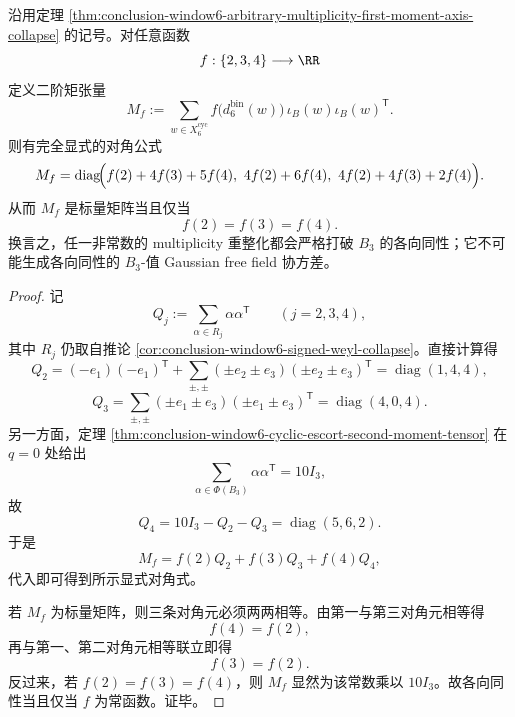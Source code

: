 \begin{theorem}\label{thm:conclusion-window6-arbitrary-multiplicity-second-moment-rigidity}
沿用定理 \ref{thm:conclusion-window6-arbitrary-multiplicity-first-moment-axis-collapse} 的记号。对任意函数
\[
f:\{2,3,4\}\longrightarrow \RR
\]
定义二阶矩张量
\[
M_f
:=
\sum_{w\in X_6^{\mathrm{cyc}}}
f\!\bigl(d_6^{\mathrm{bin}}(w)\bigr)\,
\iota_B(w)\iota_B(w)^{\mathsf T}.
\]
则有完全显式的对角公式
\[
M_f
=
\operatorname{diag}\!\Bigl(
f(2)+4f(3)+5f(4),\ 
4f(2)+6f(4),\ 
4f(2)+4f(3)+2f(4)
\Bigr).
\]
从而 \(M_f\) 是标量矩阵当且仅当
\[
f(2)=f(3)=f(4).
\]
换言之，任一非常数的 multiplicity 重整化都会严格打破 \(B_3\) 的各向同性；它不可能生成各向同性的 \(B_3\)-值 Gaussian free field 协方差。
\end{theorem}
\begin{proof}
记
\[
Q_j:=\sum_{\alpha\in R_j}\alpha\alpha^{\mathsf T}
\qquad (j=2,3,4),
\]
其中 \(R_j\) 仍取自推论 \ref{cor:conclusion-window6-signed-weyl-collapse}。直接计算得
\[
Q_2
=
(-e_1)(-e_1)^{\mathsf T}
+\sum_{\pm,\pm}(\pm e_2\pm e_3)(\pm e_2\pm e_3)^{\mathsf T}
=
\operatorname{diag}(1,4,4),
\]
\[
Q_3
=
\sum_{\pm,\pm}(\pm e_1\pm e_3)(\pm e_1\pm e_3)^{\mathsf T}
=
\operatorname{diag}(4,0,4).
\]
另一方面，定理 \ref{thm:conclusion-window6-cyclic-escort-second-moment-tensor} 在 \(q=0\) 处给出
\[
\sum_{\alpha\in\Phi(B_3)}\alpha\alpha^{\mathsf T}=10I_3,
\]
故
\[
Q_4=10I_3-Q_2-Q_3=\operatorname{diag}(5,6,2).
\]
于是
\[
M_f=f(2)Q_2+f(3)Q_3+f(4)Q_4,
\]
代入即可得到所示显式对角式。

若 \(M_f\) 为标量矩阵，则三条对角元必须两两相等。由第一与第三对角元相等得
\[
f(4)=f(2),
\]
再与第一、第二对角元相等联立即得
\[
f(3)=f(2).
\]
反过来，若 \(f(2)=f(3)=f(4)\)，则 \(M_f\) 显然为该常数乘以 \(10I_3\)。故各向同性当且仅当 \(f\) 为常函数。证毕。
\end{proof}

